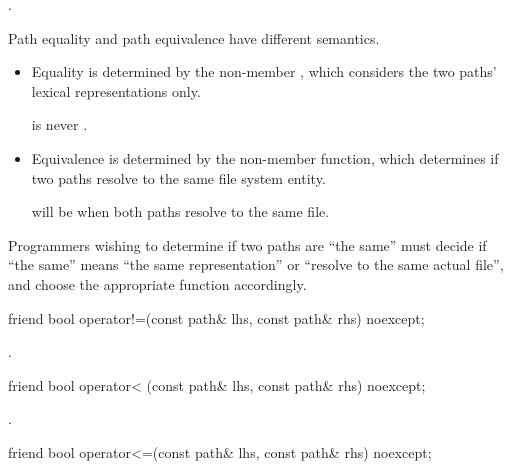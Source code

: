 \begin{itemdescr}
\pnum
\returns {}.

\pnum
\begin{note} Path equality and path equivalence have different semantics.
\begin{itemize}
\item Equality is determined by the  non-member ,
which considers the two paths' lexical representations only.
\begin{example}  is never . \end{example}
\item Equivalence is determined by the  non-member function, which
determines if two paths resolve to the same file system entity.
\begin{example}
 will be  when both paths resolve to the same file.
\end{example}
\end{itemize}
Programmers wishing to determine if two paths are ``the same'' must decide if
  ``the same'' means ``the same representation'' or ``resolve to the same actual
  file'', and choose the appropriate function accordingly. \end{note}
\end{itemdescr}

%
\begin{itemdecl}
friend bool operator!=(const path& lhs, const path& rhs) noexcept;
\end{itemdecl}

\begin{itemdescr}
\pnum
\returns {}.
\end{itemdescr}

%
\begin{itemdecl}
friend bool operator< (const path& lhs, const path& rhs) noexcept;
\end{itemdecl}

\begin{itemdescr}
\pnum
\returns {}.
\end{itemdescr}

%
\begin{itemdecl}
friend bool operator<=(const path& lhs, const path& rhs) noexcept;
\end{itemdecl}

